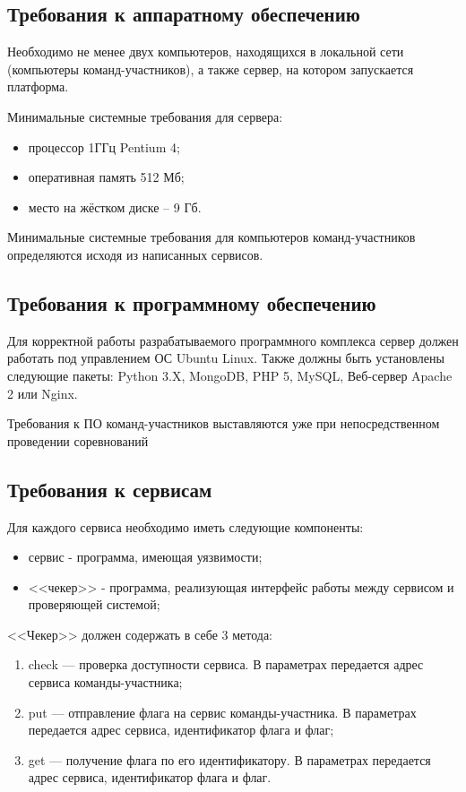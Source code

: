 \subsection {Требования к аппаратному обеспечению}

Необходимо не менее двух компьютеров, находящихся в локальной сети (компьютеры команд-участников), а также сервер, на котором запускается платформа.

Минимальные системные требования для сервера:

\begin{itemize}
\item процессор 1ГГц Pentium 4;
\item оперативная память 512 Мб;
\item место на жёстком диске -- 9 Гб.
\end{itemize}

Минимальные системные требования для компьютеров команд-участников определяются исходя из написанных сервисов.

\subsection {Требования к программному обеспечению}
Для корректной работы разрабатываемого программного комплекса сервер должен работать под управлением ОС Ubuntu Linux. 
Также должны быть установлены следующие пакеты: Python 3.X, MongoDB, PHP 5, MySQL, Веб-сервер Apache 2 или Nginx.


Требования к ПО команд-участников выставляются уже при непосредственном проведении соревнований

\subsection {Требования к сервисам}
Для каждого сервиса необходимо иметь следующие компоненты:

\begin{itemize}
\item сервис - программа, имеющая уязвимости;
\item <<чекер>> - программа, реализующая интерфейс работы между сервисом и проверяющей системой;
\end{itemize}

<<Чекер>> должен содержать в себе 3 метода:

\begin{enumerate}
\item check --- проверка доступности сервиса. В параметрах передается адрес сервиса команды-участника;
\item put --- отправление флага на сервис команды-участника. В параметрах передается адрес сервиса, идентификатор флага и флаг;
\item get --- получение флага по его идентификатору. В параметрах передается адрес сервиса, идентификатор флага и флаг.
\end{enumerate}

